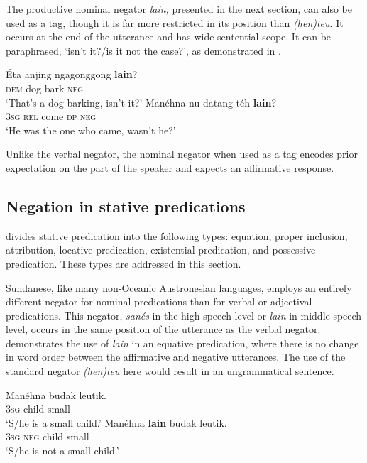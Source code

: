 \documentclass[output=paper]{langscibook}
\begin{document}
The productive nominal negator \textit{lain,} presented in the next section, can also be used as a tag, though it is far more restricted in its position than \textit{(hen)teu}. It occurs at the end of the utterance and has wide sentential scope. It can be paraphrased, ‘isn’t it?/is it not the case?’, as demonstrated in . 

\ea\label{ex:sun:18}
    \ea\label{ex:sun:18a}
        \gll  Éta anjing ngagonggong \textbf{lain}?\\ 
              \textsc{dem} dog bark \textsc{neg} \\
        \glt ‘That’s a dog barking, isn’t it?’
    \ex\label{ex:sun:18b}
        \gll  Manéhna nu datang téh \textbf{lain}?\\
              3\textsc{sg} \textsc{rel} come \textsc{dp} \textsc{neg}\\
        \glt ‘He was the one who came, wasn’t he?’
    \z
\z  

Unlike the verbal negator, the nominal negator when used as a tag encodes prior expectation on the part of the speaker and expects an affirmative response. 

\subsection{Negation in stative predications}\label{sec:sun:2.3}

\citet[111]{Payne1997} divides stative predication into the following types: equation, proper inclusion, attribution, locative predication, existential predication, and possessive predication. These types are addressed in this section. 

Sundanese, like many non-Oceanic Austronesian languages, employs an entirely different negator for nominal predications than for verbal or adjectival predications. This negator, \textit{sanés} in the high speech level or \textit{lain} in middle speech level, occurs in the same position of the utterance as the verbal negator.  demonstrates the use of \textit{lain} in an equative predication, where there is no change in word order between the affirmative and negative utterances. The use of the standard negator \textit{(hen)teu} here would result in an ungrammatical sentence. 

\ea\label{ex:sun:19}
    \ea\label{ex:sun:19a}
        \gll  Manéhna budak leutik.\\ 
              3\textsc{sg} child small\\
        \glt ‘S/he is a small child.’
    \ex\label{ex:sun:19b}
        \gll  Manéhna \textbf{lain} budak leutik.\\
              3\textsc{sg} \textsc{neg} child small\\
        \glt ‘S/he is not a small child.’
    \z
\z  
\end{document}
